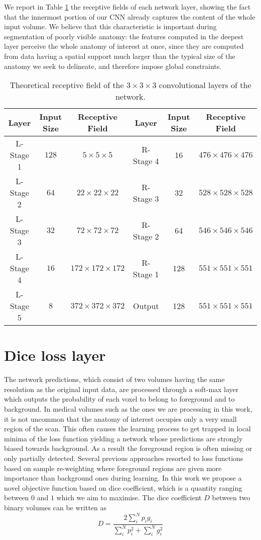 \documentclass{llncs}
\begin{document}
We report in Table \ref{table:receptiveFields} the receptive fields of each network layer, showing the fact that the innermost portion of our CNN already captures the content of the whole input volume. We believe that this characteristic is important during segmentation of poorly visible anatomy: the features computed in the deepest layer perceive the whole anatomy of interest at once, since they are computed from data having a spatial support much larger than the typical size of the anatomy we seek to delineate, and therefore impose global constraints.

\begin{table}
\begin{centering}
\protect\caption{Theoretical receptive field of the $3\times3\times3$ convolutional layers of the network.} 
\begin{tabular}{|c|c|c||c|c|c|}
\hline 
Layer & Input Size & Receptive Field & Layer & Input Size & Receptive Field\tabularnewline
\hline 
\hline 
L-Stage 1 & $128$ & $5\times5\times5$ & R-Stage 4 & 16 & $476\times476\times476$\tabularnewline
\hline 
L-Stage 2 & $64$ & $22\times22\times22$ & R-Stage 3 & 32 & $528\times528\times528$\tabularnewline
\hline 
L-Stage 3 & $32$ & $72\times72\times72$ & R-Stage 2 & 64 & $546\times546\times546$\tabularnewline
\hline 
L-Stage 4 & $16$ & $172\times172\times172$ & R-Stage 1 & 128 & $551\times551\times551$\tabularnewline
\hline 
L-Stage 5 & $8$ & $372\times372\times372$ & Output & 128 & \textbf{$551\times551\times551$}\tabularnewline
\hline 
\end{tabular} \label{table:receptiveFields}
\par\end{centering}
\end{table}

\section{Dice loss layer}
The network predictions, which consist of two volumes having the same resolution as the original input data, are processed through a soft-max layer which outputs the probability of each voxel to belong to foreground and to background. In medical volumes such as the ones we are processing in this work, it is not uncommon that the anatomy of interest occupies only a very small region of the scan. This often causes the learning process to get trapped in local minima of the loss function yielding a network whose predictions are strongly biased towards background. As a result the foreground region is often missing or only partially detected. Several previous approaches resorted to loss functions based on sample re-weighting where foreground regions are given more importance than background ones during learning. In this work we propose a novel objective function based on dice coefficient, which is a quantity ranging between $0$ and $1$ which we aim to maximise. The dice coefficient $D$ between two binary volumes can be written as
\[
D=\frac{2\sum_{i}^{N}p_{i}g_{i}}{\sum_{i}^{N}p_{i}^{2}+\sum_{i}^{N}g_{i}^{2}}
\]
\end{document}
